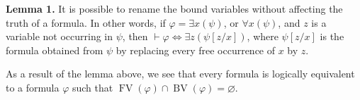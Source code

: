 \documentclass[12pt]{article}
\newcommand{\Iff}{\Leftrightarrow}
\newcommand{\proves}{\vdash}
\begin{document}
{\bf Lemma 1. }
It is possible to rename the bound variables without affecting the truth of a formula.  In other words, if $\varphi=\exists x(\psi)$, or $\forall x(\psi)$, and $z$ is a variable not occurring in $\psi$, then $\proves \varphi\Iff\exists z(\psi[z/x])$, where $\psi[z/x]$ is the formula obtained from $\psi$ by replacing every free occurrence of $x$ by $z$.

As a result of the lemma above, we see that every formula is logically equivalent to a formula $\varphi$ such that $\operatorname{FV}(\varphi)\cap \operatorname{BV}(\varphi)=\varnothing$.

\end{document}
